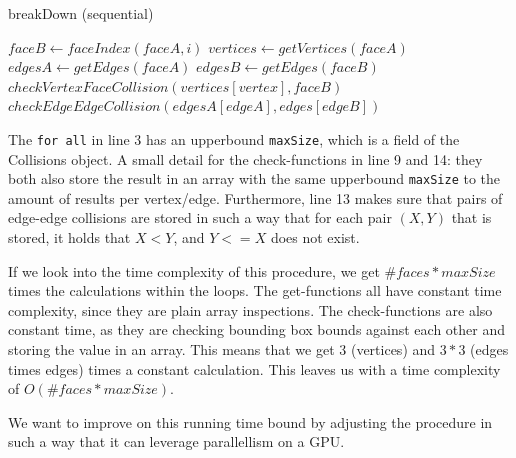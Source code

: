 \begin{algorithm}
\caption{breakDown (sequential)}\label{alg:breakseq}
\begin{algorithmic}[1]
            \State $faceB \gets faceIndex(faceA, i)$ 
            \State $vertices \gets getVertices(faceA)$
            \State $edgesA \gets getEdges(faceA)$
            \State $edgesB \gets getEdges(faceB)$
                \State $checkVertexFaceCollision(vertices[vertex], faceB)$
            \EndFor
                     
                        \State $checkEdgeEdgeCollision(edgesA[edgeA], edges[edgeB])$
                    \EndIf
                \EndFor
            \EndFor
        \EndFor
    \EndFor
\EndProcedure
\end{algorithmic}
\end{algorithm}

The \texttt{for all} in line 3 has an upperbound \texttt{maxSize}, which is a field of the Collisions object. A small detail for the check-functions in line 9 and 14: they both also store the result in an array with the same upperbound \texttt{maxSize} to the amount of results per vertex/edge. Furthermore, line 13 makes sure that pairs of edge-edge collisions are stored in such a way that for each pair $(X,Y)$ that is stored, it holds that $X < Y$, and $Y <= X$ does not exist.

If we look into the time complexity of this procedure, we get $\#faces *  maxSize$ times the calculations within the loops. The get-functions all have constant time complexity, since they are plain array inspections. The check-functions are also constant time, as they are checking bounding box bounds against each other and storing the value in an array. This means that we get $3$ (vertices) and $3*3$ (edges times edges) times a constant calculation. This leaves us with a time complexity of $O(\#faces *  maxSize)$.

We want to improve on this running time bound by adjusting the procedure in such a way that it can leverage parallellism on a GPU.
